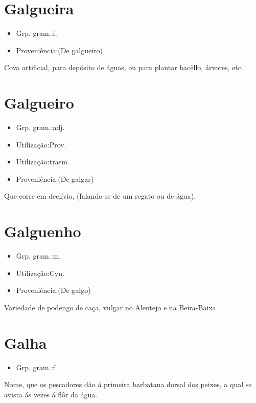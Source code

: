 \section{Galgueira}
\begin{itemize}
\item {Grp. gram.:f.}
\end{itemize}
\begin{itemize}
\item {Proveniência:(De \textunderscore galgueiro\textunderscore )}
\end{itemize}
Cova artificial, para depósito de águas, ou para plantar bacêllo, árvores, etc.
\section{Galgueiro}
\begin{itemize}
\item {Grp. gram.:adj.}
\end{itemize}
\begin{itemize}
\item {Utilização:Prov.}
\end{itemize}
\begin{itemize}
\item {Utilização:trasm.}
\end{itemize}
\begin{itemize}
\item {Proveniência:(De \textunderscore galgar\textunderscore )}
\end{itemize}
Que corre em declívio, (falando-se de um regato ou de água).
\section{Galguenho}
\begin{itemize}
\item {Grp. gram.:m.}
\end{itemize}
\begin{itemize}
\item {Utilização:Cyn.}
\end{itemize}
\begin{itemize}
\item {Proveniência:(De \textunderscore galgo\textunderscore )}
\end{itemize}
Variedade de podengo de caça, vulgar no Alentejo e na Beira-Baixa.
\section{Galha}
\begin{itemize}
\item {Grp. gram.:f.}
\end{itemize}
Nome, que os pescadores dão á primeira barbatana dorsal dos peixes, a qual se avista ás vezes á flôr da água.
